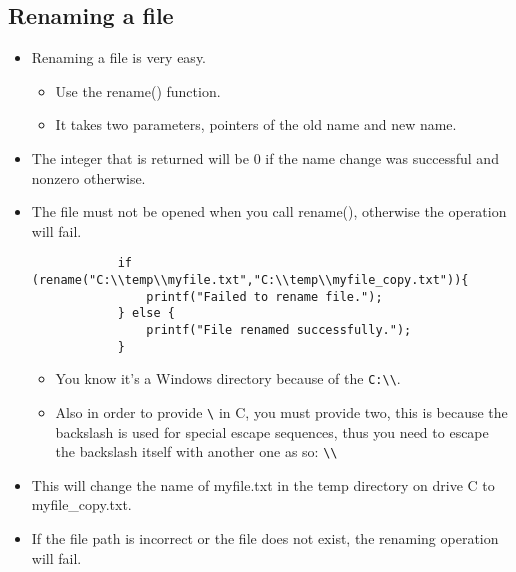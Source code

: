 \subsection{Renaming a file}
\begin{itemize}
    \item Renaming a file is very easy.
        \begin{itemize}
            \item Use the rename() function.
            \item It takes two parameters, pointers of the old name and new name.
        \end{itemize}
    
    \item The integer that is returned will be 0 if the name change was successful and nonzero otherwise.
    \item The file must not be opened when you call rename(), otherwise the operation will fail.
        \begin{verbatim}
            if (rename("C:\\temp\\myfile.txt","C:\\temp\\myfile_copy.txt")){
                printf("Failed to rename file.");
            } else {
                printf("File renamed successfully.");
            }
        \end{verbatim}
        \begin{itemize}
            \item You know it's a Windows directory because of the \verb|C:\\|.
            \item Also in order to provide \verb|\| in C, you must provide two, this is because the backslash is used for special escape sequences, thus you need to escape the backslash itself with another one as so: \verb|\\|
        \end{itemize}
    
    \item This will change the name of myfile.txt in the temp directory on drive C to myfile\_copy.txt.
    \item If the file path is incorrect or the file does not exist, the renaming operation will fail.
\end{itemize}

